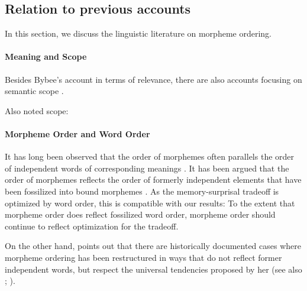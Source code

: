 \documentclass[11pt,letterpaper]{article}
\begin{document}
\subsection{Relation to previous accounts}


In this section, we discuss the linguistic literature on morpheme ordering.

\paragraph{Meaning and Scope}


Besides Bybee's account in terms of relevance, there are also accounts focusing on semantic scope \citep{rice2000morpheme}.

Also noted scope: \citep{baker1988incorporation,foley1984functional,chierchia1990meaning,valin1992a}



\paragraph{Morpheme Order and Word Order}
It has long been observed that the order of morphemes often parallels the order of independent words of corresponding meanings \citep{givon1971historical,venneman1973explanation,baker1985the}.
It has been argued that the order of morphemes reflects the order of formerly independent elements that have been fossilized into bound morphemes \citet{givon1971historical,venneman1973explanation}.
As the memory-surprisal tradeoff is optimized by word order, this is compatible with our results:
To the extent that morpheme order does reflect fossilized word order, morpheme order should continue to reflect optimization for the tradeoff.

On the other hand, \citet{bybee-morphology-1985} points out that there are historically documented cases where morpheme ordering has been restructured in ways that do not reflect former independent words, but respect the universal tendencies proposed by her (see also \citet{mithun2000the, haspelmath1993the, mithun1995affixation}; \citet[Section 15]{rice2000morpheme}).
\end{document}
